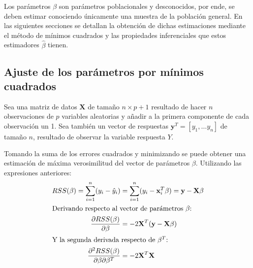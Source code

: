 \noindent Los parámetros $\beta$ son parámetros poblacionales y desconocidos, por ende, se deben estimar conociendo únicamente una muestra de la población general. En las siguientes secciones se detallan la obtención de dichas estimaciones mediante el método de mínimos cuadrados y las propiedades inferenciales que estos estimadores $\hat{\beta}$ tienen. 

\newpage
\subsection{Ajuste de los parámetros por mínimos cuadrados}
\noindent Sea una matriz de datos $\textbf{X}$ de tamaño $n\times p+1$ resultado de hacer $n$ observaciones de $p$ variables aleatorias y añadir a la primera componente de cada observación un 1. Sea también un vector de respuestas $\textbf{y}^T=[y_1,\ldots y_n]$ de tamaño $n$, resultado de observar la variable respuesta $Y$. 

\noindent Tomando la suma de los errores cuadrados y minimizando se puede obtener una estimación de máxima verosimilitud del vector de parámetros $\beta$. Utilizando las expresiones anteriores:
\begin{align}
RSS(\beta)=\sum_{i=1}^n(y_i-\hat{y}_i) &= \sum_{i=1}^n(y_i-\textbf{x}_i^T\beta )=\textbf{y}-\textbf{X}\beta\\
\intertext{Derivando respecto al vector de parámetros $\beta$:}
\dfrac{\partial RSS (\beta)}{\partial \beta}&=-2\textbf{X}^T(\textbf{y}-\textbf{X}\beta)\\
\intertext{Y la segunda derivada respecto de $\beta^T$: }
\dfrac{\partial^2 RSS (\beta)}{\partial \beta \partial \beta^T} &=  -2 \textbf{X}^T\textbf{X}
\end{align}

